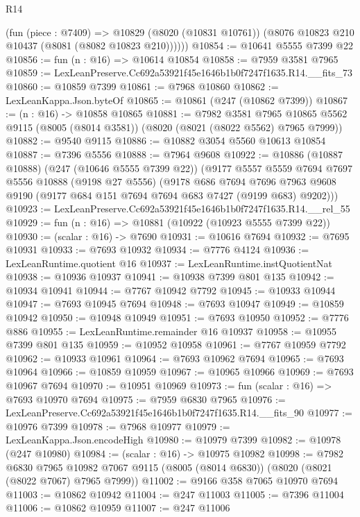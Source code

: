 \begin{lexlean}{R14}
\begin{coremodule}
        (fun (piece : @7409) =>
        @10829 (@8020 (@10831 @10761)) (@8076 @10823 @210 @10437 (@8081 (@8082 @10823 @210))))))
@10854 := @10641 @5555 @7399 @22
@10856 := fun (n : @16) => @10614 @10854
@10858 := @7959 @3581 @7965
@10859 := LexLeanPreserve.Cc692a53921f45e1646b1b0f7247f1635.R14.__fits_73
@10860 := @10859 @7399
@10861 := @7968 @10860
@10862 := LexLeanKappa.Json.byteOf
@10865 := @10861 (@247 (@10862 @7399))
@10867 := (n : @16) -> @10858 @10865
@10881 := @7982
    @3581
    @7965
    @10865
    @5562
    @9115
    (@8005 (@8014 @3581))
    (@8020 (@8021 (@8022 @5562) @7965 @7999))
@10882 := @9540 @9115
@10886 := @10882 @3054 @5560 @10613 @10854
@10887 := @7396 @5556
@10888 := @7964 @9608
@10922 := @10886
    (@10887 @10888)
    (@247 (@10646 @5555 @7399 @22))
    (@9177
      @5557
      @5559
      @7694
      @7697
      @5556
      @10888
      (@9198 @27 @5556)
      (@9178
        @686
        @7694
        @7696
        @7963
        @9608
        @9190
        (@9177 @684 @151 @7694 @7694 @683 @7427 (@9199 @683) @9202)))
@10923 := LexLeanPreserve.Cc692a53921f45e1646b1b0f7247f1635.R14.__rel_55
@10929 := fun (n : @16) => @10881 (@10922 (@10923 @5555 @7399 @22))
@10930 := (scalar : @16) -> @7690
@10931 := @10616 @7694
@10932 := @7695 @10931
@10933 := @7693 @10932
@10934 := @7776 @4124
@10936 := LexLeanRuntime.quotient @16
@10937 := LexLeanRuntime.instQuotientNat
@10938 := @10936 @10937
@10941 := @10938 @7399 @801 @135
@10942 := @10934 @10941
@10944 := @7767 @10942 @7792
@10945 := @10933 @10944
@10947 := @7693 @10945 @7694
@10948 := @7693 @10947
@10949 := @10859 @10942
@10950 := @10948 @10949
@10951 := @7693 @10950
@10952 := @7776 @886
@10955 := LexLeanRuntime.remainder @16 @10937
@10958 := @10955 @7399 @801 @135
@10959 := @10952 @10958
@10961 := @7767 @10959 @7792
@10962 := @10933 @10961
@10964 := @7693 @10962 @7694
@10965 := @7693 @10964
@10966 := @10859 @10959
@10967 := @10965 @10966
@10969 := @7693 @10967 @7694
@10970 := @10951 @10969
@10973 := fun (scalar : @16) => @7693 @10970 @7694
@10975 := @7959 @6830 @7965
@10976 := LexLeanPreserve.Cc692a53921f45e1646b1b0f7247f1635.R14.__fits_90
@10977 := @10976 @7399
@10978 := @7968 @10977
@10979 := LexLeanKappa.Json.encodeHigh
@10980 := @10979 @7399
@10982 := @10978 (@247 @10980)
@10984 := (scalar : @16) -> @10975 @10982
@10998 := @7982
    @6830
    @7965
    @10982
    @7067
    @9115
    (@8005 (@8014 @6830))
    (@8020 (@8021 (@8022 @7067) @7965 @7999))
@11002 := @9166 @358 @7065 @10970 @7694
@11003 := @10862 @10942
@11004 := @247 @11003
@11005 := @7396 @11004
@11006 := @10862 @10959
@11007 := @247 @11006

\end{coremodule}
\end{lexlean}
